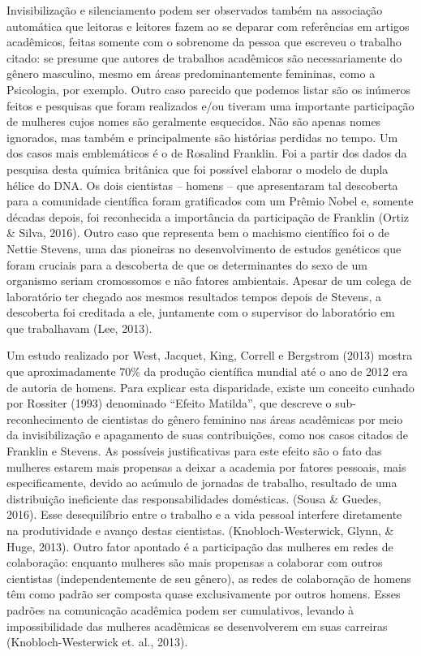 Invisibilização e silenciamento podem ser observados também na associação automática que leitoras e leitores fazem ao se deparar com referências em artigos acadêmicos, feitas somente com o sobrenome da pessoa que escreveu o trabalho citado: se presume que autores de trabalhos acadêmicos são necessariamente do gênero masculino, mesmo em áreas predominantemente femininas, como a Psicologia, por exemplo. Outro caso parecido que podemos listar são os inúmeros feitos e pesquisas que foram realizados e/ou tiveram uma importante participação de mulheres cujos nomes são geralmente esquecidos. Não são apenas nomes ignorados, mas também e principalmente são histórias perdidas no tempo. Um dos casos mais emblemáticos é o de Rosalind Franklin. Foi a partir dos dados da pesquisa desta química britânica que foi possível elaborar o modelo de dupla hélice do DNA. Os dois cientistas – homens – que apresentaram tal descoberta para a comunidade científica foram gratificados com um Prêmio Nobel e, somente décadas depois, foi reconhecida a importância da participação de Franklin (Ortiz \& Silva, 2016). Outro caso que representa bem o machismo científico foi o de Nettie Stevens, uma das pioneiras no desenvolvimento de estudos genéticos que foram cruciais para a descoberta de que os determinantes do sexo de um organismo seriam cromossomos e não fatores ambientais. Apesar de um colega de laboratório ter chegado aos mesmos resultados tempos depois de Stevens, a descoberta foi creditada a ele, juntamente com o supervisor do laboratório em que trabalhavam (Lee, 2013).

Um estudo realizado por West, Jacquet, King, Correll e Bergstrom (2013) mostra que aproximadamente 70\% da produção científica mundial até o ano de 2012 era de autoria de homens. Para explicar esta disparidade, existe um conceito cunhado por Rossiter (1993) denominado “Efeito Matilda”, que descreve o sub-reconhecimento de cientistas do gênero feminino nas áreas acadêmicas por meio da invisibilização e apagamento de suas contribuições, como nos casos citados de Franklin e Stevens. As possíveis justificativas para este efeito são o fato das mulheres estarem mais propensas a deixar a academia por fatores pessoais, mais especificamente, devido ao acúmulo de jornadas de trabalho, resultado de uma distribuição ineficiente das responsabilidades domésticas. (Sousa \& Guedes, 2016). Esse desequilíbrio entre o trabalho e a vida pessoal interfere diretamente na produtividade e avanço destas cientistas. (Knobloch-Westerwick, Glynn, \& Huge, 2013). Outro fator apontado é a participação das mulheres em redes de colaboração: enquanto mulheres são mais propensas a colaborar com outros cientistas (independentemente de seu gênero), as redes de colaboração de homens têm como padrão ser composta quase exclusivamente por outros homens. Esses padrões na comunicação acadêmica podem ser cumulativos, levando à impossibilidade das mulheres acadêmicas se desenvolverem em suas carreiras (Knobloch-Westerwick et. al., 2013).

